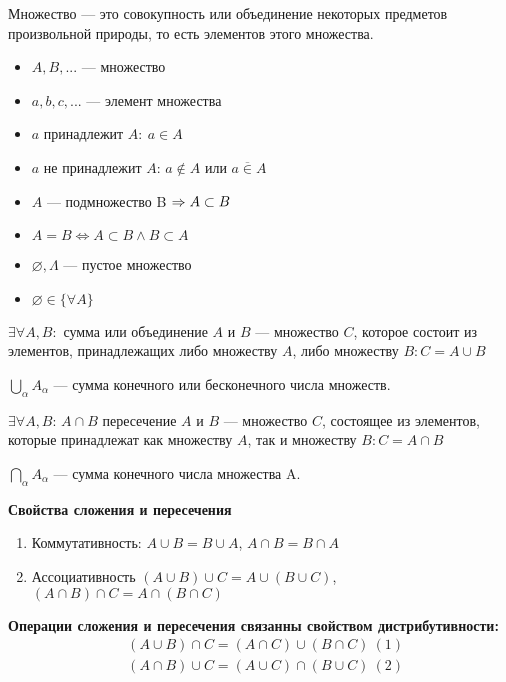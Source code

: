 \documentclass{article}
\begin{document}


Множество --- это совокупность или объединение некоторых предметов произвольной природы, то есть элементов этого множества.

\begin{itemize}
	\item $A, B, ...$ ---  множество
	\item $a, b, c, ...$ --- элемент множества
	\item $a$ принадлежит $A: \ a\in A$
	\item $a$ не принадлежит $A$: $a\notin A$ или $a \overline {\in}  A$
	\item $A$ --- подмножество B $\Rightarrow A \subset B$
	\item $A = B \Leftrightarrow  A \subset B \wedge B \subset A$
	\item $\varnothing, \Lambda$ --- пустое множество
	\item $\varnothing \in \{ \forall A\}$
\end{itemize}


$\exists \forall A, B:$ сумма или объединение $A$ и $B$ --- множество $C$, которое состоит из элементов, принадлежащих либо множеству $A$, либо множеству $B: C = A \cup B$

$\bigcup\limits_{\alpha} A_\alpha$ --- сумма конечного или бесконечного числа множеств.


$\exists \forall A, B$:  $A \cap B$  пересечение $A$ и $B$ --- множество $C$, состоящее из элементов, которые принадлежат как множеству $A$, так и множеству $B: C = A \cap B$

$\bigcap\limits_{\alpha} A_\alpha$ --- сумма конечного числа множества A.

	{\bf Свойства сложения и пересечения}
\begin{enumerate}
	\item Коммутативность: $A \cup B = B \cup A$, $A \cap B = B \cap A$

	\item Ассоциативность $(A \cup B) \cup C  = A \cup (B \cup C) $, $ (A \cap B) \cap C = A \cap (B \cap C)$
\end{enumerate}
{\bf Операции сложения и пересечения связанны свойством дистрибутивности:}
\begin{align*}
	 & (A \cup B) \cap C  = (A \cap C) \cup (B \cap C) \ (1) \\
	 & (A \cap B) \cup C = (A \cup C) \cap (B \cup C) \ (2)  \\
\end{align*}
\proof {}
\end{document}
